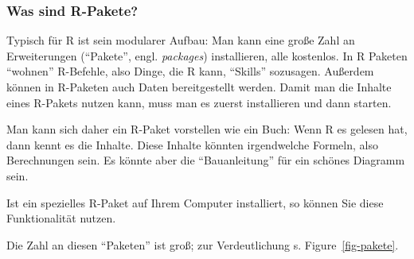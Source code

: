 \documentclass[
  letterpaper,
  DIV=11,
  numbers=noendperiod]{scrartcl}
\theoremstyle{definition}
\theoremstyle{definition}
\theoremstyle{definition}
\theoremstyle{remark}
\begin{document}
\subsubsection{Was sind R-Pakete?}\label{was-sind-r-pakete}

Typisch für R ist sein modularer Aufbau: Man kann eine große Zahl an
Erweiterungen (``Pakete'', engl. \emph{packages}) installieren, alle
kostenlos. In R Paketen ``wohnen'' R-Befehle, also Dinge, die R kann,
``Skills'' sozusagen. Außerdem können in R-Paketen auch Daten
bereitgestellt werden. Damit man die Inhalte eines R-Pakets nutzen kann,
muss man es zuerst installieren und dann starten.

Man kann sich daher ein R-Paket vorstellen wie ein Buch: Wenn R es
gelesen hat, dann kennt es die Inhalte. Diese Inhalte könnten
irgendwelche Formeln, also Berechnungen sein. Es könnte aber die
``Bauanleitung'' für ein schönes Diagramm sein.

Ist ein spezielles R-Paket auf Ihrem Computer installiert, so können Sie
diese Funktionalität nutzen.

Die Zahl an diesen ``Paketen'' ist groß; zur Verdeutlichung s.
Figure~\ref{fig-pakete}.
\end{document}
